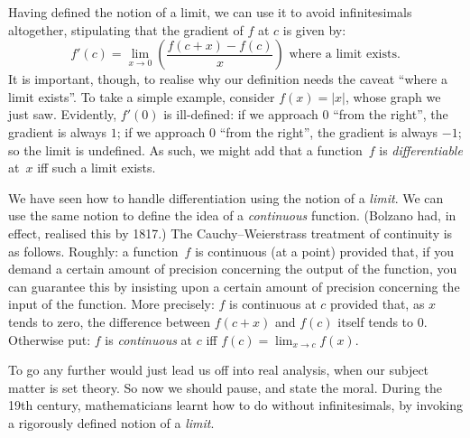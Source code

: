 \documentclass[../../../include/open-logic-section]{subfiles}
\begin{document}
Having defined the notion of a limit, we can use it to avoid
infinitesimals altogether, stipulating that the gradient of $f$ at $c$
is given by:
\[
	{f}'(c) = \lim_{x \rightarrow 0}\left(\frac{f(c +x) - f(c)}{x}\right) \text{ where a limit exists}.
\]
It is important, though, to realise why our definition needs the
caveat ``where a limit exists''. To take a simple example, consider
$f(x) = |x|$, whose graph we just saw. Evidently, $f'(0)$ is
ill-defined: if we approach $0$ ``from the right'', the gradient is
always $1$; if we approach $0$ ``from the right'', the gradient is
always $-1$; so the limit is undefined. As such, we might add that a
function~$f$ is \emph{differentiable} at~$x$ iff such a limit exists.

We have seen how to handle differentiation using the notion of a
\emph{limit}. We can use the same notion to define the idea of a
\emph{continuous} function. (Bolzano had, in effect, realised this by
1817.) The Cauchy--Weierstrass treatment of continuity is as follows.
Roughly: a function~$f$ is continuous (at a point) provided that, if
you demand a certain amount of precision concerning the output of the
function, you can guarantee this by insisting upon a certain amount of
precision concerning the input of the function. More precisely: $f$ is
continuous at $c$ provided that, as $x$ tends to zero, the difference
between $f(c + x)$ and $f(c)$ itself tends to $0$. Otherwise put: $f$
is \emph{continuous} at $c$ iff $f(c) = \lim_{x \rightarrow c} f(x)$. 

To go any further would just lead us off into real analysis, when our
subject matter is set theory. So now we should pause, and state the
moral. During the 19th century, mathematicians learnt how to do
without infinitesimals, by invoking a rigorously defined notion of a
\emph{limit}.
\end{document}
